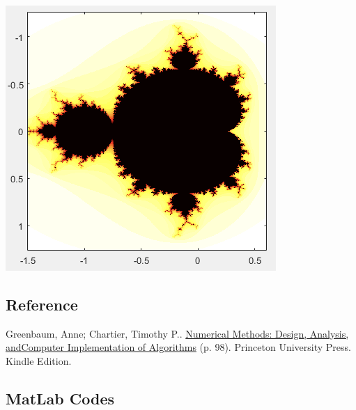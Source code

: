 \documentclass[11pt]{article}
\theoremstyle{plain}
\theoremstyle{definition}
\begin{document}
\begin{center}
	\includegraphics*[scale = 0.5]{Plot9.png}
\end{center}

\subsection*{Reference}
Greenbaum, Anne; Chartier, Timothy P.. \underline{Numerical Methods: Design, Analysis, and}\linebreak \underline{Computer Implementation of Algorithms} (p. 98). Princeton University Press. Kindle Edition. 

\pagebreak

\pagebreak

\subsection*{MatLab Codes}
\end{document}
